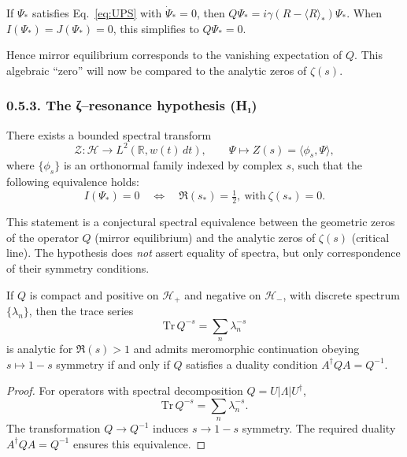 \begin{proposition}
If $\Psi_*$ satisfies Eq.~\eqref{eq:UPS} with $\dot\Psi_*=0$,
then $Q\Psi_*=i\gamma(R-\langle R\rangle_*)\Psi_*$.
When $I(\Psi_*)=J(\Psi_*)=0$, this simplifies to $Q\Psi_*=0$.
\end{proposition}

\begin{remark}
Hence mirror equilibrium corresponds to the vanishing expectation of $Q$.
This algebraic “zero” will now be compared to the analytic zeros of $\zeta(s)$.
\end{remark}

\subsubsection*{0.5.3. The ζ–resonance hypothesis (H₁)}

\begin{hypothesis}
There exists a bounded spectral transform
\[
\mathcal{Z}:\mathcal{H}\to L^2(\mathbb{R},w(t)\,dt),\qquad \Psi\mapsto Z(s)=\langle\phi_s,\Psi\rangle,
\]
where $\{\phi_s\}$ is an orthonormal family indexed by complex $s$,
such that the following equivalence holds:
\[
I(\Psi_*)=0\quad\Longleftrightarrow\quad \Re(s_*)=\tfrac12,\ \text{with}\ \zeta(s_*)=0.
\]
\]
\end{hypothesis}

\begin{remark}
This statement is a conjectural spectral equivalence between the geometric zeros of the operator $Q$ (mirror equilibrium) and the analytic zeros of $\zeta(s)$ (critical line).
The hypothesis does \emph{not} assert equality of spectra, but only correspondence of their symmetry conditions.
\end{remark}

\begin{proposition}
If $Q$ is compact and positive on $\mathcal{H}_+$ and negative on $\mathcal{H}_-$, with discrete spectrum $\{\lambda_n\}$, then the trace series
\[
\mathrm{Tr}\,Q^{-s}=\sum_{n}\lambda_n^{-s}
\]
is analytic for $\Re(s)>1$ and admits meromorphic continuation obeying $s\mapsto1-s$ symmetry
if and only if $Q$ satisfies a duality condition
$A^\dagger Q A = Q^{-1}$.
\end{proposition}

\begin{proof}
For operators with spectral decomposition $Q=U|\Lambda|U^\dagger$, 
\[
\mathrm{Tr}\,Q^{-s}=\sum_n \lambda_n^{-s}.
\]
The transformation $Q\to Q^{-1}$ induces $s\to1-s$ symmetry.
The required duality $A^\dagger Q A = Q^{-1}$ ensures this equivalence.
\end{proof}


